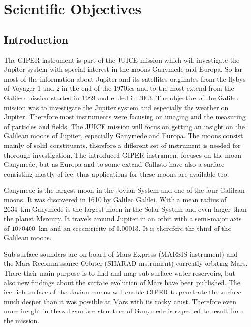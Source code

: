 
\section{Scientific Objectives}


\subsection{Introduction\label{sub:Introduction-science}}

The GIPER instrument is part of the JUICE mission which will investigate
the Jupiter system with special interest in the moons Ganymede and
Europa. So far most of the information about Jupiter and its satellites
originates from the flybys of Voyager 1 and 2 in the end of the 1970ies
and to the most extend from the Galileo mission started in 1989 and
ended in 2003. The objective of the Galileo mission was to investigate
the Jupiter system and especially the weather on Jupiter. Therefore
most instruments were focusing on imaging and the measuring of particles
and fields. The JUICE mission will focus on getting an insight on
the Galilean moons of Jupiter, especially Ganymede and Europa. The
moons consist mainly of solid constituents, therefore a different
set of instrument is needed for thorough investigation. The introduced
GIPER instrument focuses on the moon Ganymede, but as Europa and to
some extend Callisto have also a surface consisting mostly of ice,
thus applications for these moons are available too\cite{pater2010planetary}.

Ganymede is the largest moon in the Jovian System and one of the four
Galilean moons. It was discovered in 1610 by Galileo Galilei. With
a mean radius of 2634~km Ganymede is the largest moon in the Solar
System and even larger than the planet Mercury. It travels around
Jupiter in an orbit with a semi-major axis of $1070400$~km and an
eccentricity of 0.00013. It is therefore the third of the Galilean
moons\cite{pater2010planetary}. 

Sub-surface sounders are on board of Mars Express (MARSIS instrument)
and the Mars Reconnaissance Orbiter (SHARAD instrument) currently
orbiting Mars. There their main purpose is to find and map sub-surface
water reservoirs\cite{Mouginot2010}, but also new findings about
the surface evolution of Mars have been published\cite{Watters2006}.
The ice rich surface of the Jovian moons will enable GIPER to penetrate
the surface much deeper than it was possible at Mars with its rocky
crust. Therefore even more insight in the sub-surface structure of
Ganymede is expected to result from the mission. 


